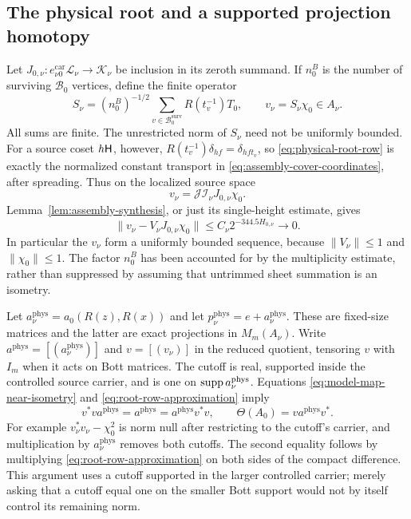 \subsection{The physical root and a supported projection homotopy}

Let $J_{0,\nu}\colon e_{\nu0}^{\mathrm{car}}\mathscr L_\nu
\to\mathscr K_\nu$ be inclusion in its zeroth summand.  If $n_0^B$ is the
number of surviving $\mathscr B_0$ vertices, define the finite operator
\begin{equation}\label{eq:physical-root-row}
 S_\nu=(n_0^B)^{-1/2}\sum_{v\in\mathscr B_0^{\mathrm{surv}}}
               R(t_v^{-1})T_0,
 \qquad v_\nu=S_\nu\chi_0\in A_\nu.
\end{equation}
All sums are finite.  The unrestricted norm of $S_\nu$ need not be uniformly
bounded.  For a source coset $h\mathsf H$, however,
$R(t_v^{-1})\delta_{hf}=\delta_{hft_v}$, so
\eqref{eq:physical-root-row} is exactly the normalized constant transport
in \eqref{eq:assembly-cover-coordinates}, after spreading.  Thus on the
localized source space
\[
 v_\nu=\mathcal J\mathcal I_\nu J_{0,\nu}\chi_0.
\]
Lemma~\ref{lem:assembly-synthesis}, or just its single-height estimate,
gives
\begin{equation}\label{eq:root-row-approximation}
 \|v_\nu-V_\nu J_{0,\nu}\chi_0\|
       \le C_\nu2^{-344.5H_{0,\nu}}\longrightarrow0.
\end{equation}
In particular the $v_\nu$ form a uniformly bounded sequence, because
$\|V_\nu\|\le1$ and $\|\chi_0\|\le1$.  The factor $n_0^B$ has been
accounted for by the multiplicity estimate, rather than suppressed by
assuming that untrimmed sheet summation is an isometry.

Let $a_\nu^{\mathrm{phys}}=a_0(R(z),R(x))$ and let
$p_\nu^{\mathrm{phys}}=e+a_\nu^{\mathrm{phys}}$.
These are fixed-size matrices and the latter are exact projections in
$M_m(A_\nu)$.  Write $a^{\mathrm{phys}}=[(a_\nu^{\mathrm{phys}})]$ and
$v=[(v_\nu)]$ in the reduced quotient, tensoring $v$ with $I_m$ when it
acts on Bott matrices.  The cutoff is real, supported inside the controlled
source carrier, and is one on $\operatorname{supp} a_\nu^{\mathrm{phys}}$.  Equations
\eqref{eq:model-map-near-isometry} and
\eqref{eq:root-row-approximation} imply
\begin{equation}\label{eq:root-supported-isometry}
 v^*v a^{\mathrm{phys}}=a^{\mathrm{phys}}
       =a^{\mathrm{phys}}v^*v,
 \qquad
 \Theta(A_0)=v a^{\mathrm{phys}}v^*.
\end{equation}
For example $v_\nu^*v_\nu-\chi_0^2$ is norm null after restricting to
the cutoff's carrier, and multiplication by $a_\nu^{\mathrm{phys}}$
removes both cutoffs.  The second equality follows by multiplying
\eqref{eq:root-row-approximation} on both sides of the compact difference.
This argument uses a cutoff supported in the larger controlled carrier;
merely asking that a cutoff equal one on the smaller Bott support would not
by itself control its remaining norm.

